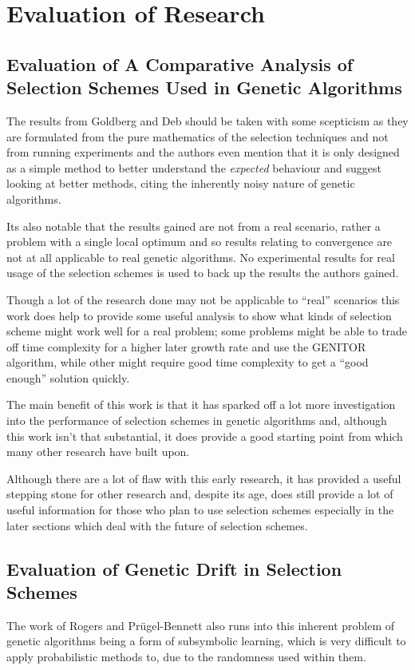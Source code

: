\documentclass[10pt, a4paper]{article}
\begin{document}
\newpage
\section{Evaluation of Research}

\subsection{Evaluation of A Comparative Analysis of Selection Schemes Used in Genetic Algorithms} 
The results from Goldberg and Deb\cite{Goldberg1991Comparative} should be taken
with some scepticism as they are formulated from the pure mathematics of the 
selection techniques and not from running experiments and the authors even 
mention that it is only designed as a simple method to better understand the 
\textit{expected} behaviour and suggest looking at better methods, citing the 
inherently noisy nature of genetic algorithms.

Its also notable that the results gained are not from a real scenario, rather a
problem with a single local optimum and so results relating to convergence are
not at all applicable to real genetic algorithms. No experimental results for
real usage of the selection schemes is used to back up the results the authors
gained.

Though a lot of the research done may not be applicable to ``real'' scenarios
this work does help to provide some useful analysis to show what kinds of
selection scheme might work well for a real problem; some problems might be able
to trade off time complexity for a higher later growth rate and use the GENITOR
algorithm, while other might require good time complexity to get a ``good
enough'' solution quickly.

The main benefit of this work is that it has sparked off a lot more
investigation into the performance of selection schemes in genetic algorithms
and, although this work isn't that substantial, it does provide a good starting
point from which many other research have built upon.

Although there are a lot of flaw with this early research, it has provided a
useful stepping stone for other research and, despite its age, does still
provide a lot of useful information for those who plan to use selection schemes
especially in the later sections which deal with the future of selection
schemes.


\subsection{Evaluation of Genetic Drift in Selection Schemes} 
The work of Rogers and Pr\"{u}gel-Bennett\cite{Rogers1999Genetic} also runs 
into this inherent problem of genetic algorithms being a form of subsymbolic 
learning, which is very difficult to apply probabilistic methods to, due to the
randomness used within them.
\end{document}
